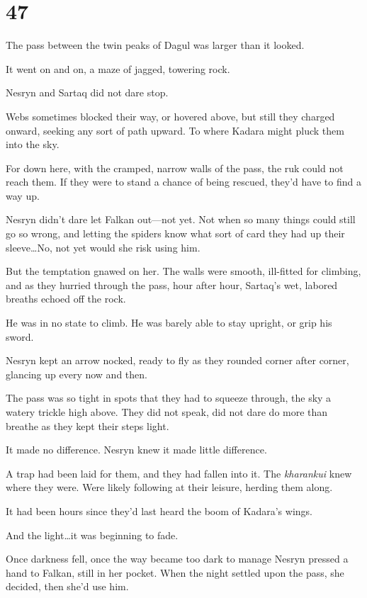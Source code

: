 
\chapter{47}

The pass between the twin peaks of Dagul was larger than it looked.

It went on and on, a maze of jagged, towering rock.

Nesryn and Sartaq did not dare stop.

Webs sometimes blocked their way, or hovered above, but still they charged onward, seeking any sort of path upward.
To where Kadara might pluck them into the sky.

For down here, with the cramped, narrow walls of the pass, the ruk could not reach them.
If they were to stand a chance of being rescued, they'd have to find a way up.

Nesryn didn't dare let Falkan out---not yet.
Not when so many things could still go so wrong, and letting the spiders know what sort of card they had up their sleeve\ldots No, not yet would she risk using him.

But the temptation gnawed on her.
The walls were smooth, ill-fitted for climbing, and as they hurried through the pass, hour after hour, Sartaq's wet, labored breaths echoed off the rock.

He was in no state to climb.
He was barely able to stay upright, or grip his sword.

Nesryn kept an arrow nocked, ready to fly as they rounded corner after corner, glancing up every now and then.

The pass was so tight in spots that they had to squeeze through, the sky a watery trickle high above.
They did not speak, did not dare do more than breathe as they kept their steps light.

It made no difference.
Nesryn knew it made little difference.

A trap had been laid for them, and they had fallen into it.
The \emph{kharankui} knew where they were.
Were likely following at their leisure, herding them along.

It had been hours since they'd last heard the boom of Kadara's wings.

And the light\ldots it was beginning to fade.

Once darkness fell, once the way became too dark to manage 
Nesryn pressed a hand to Falkan, still in her pocket.
When the night settled upon the pass, she decided, then she'd use him.

